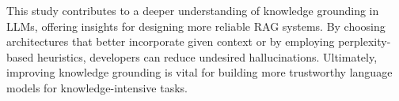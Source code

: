 This study contributes to a deeper understanding of knowledge grounding in LLMs, offering insights for designing more reliable RAG systems.
By choosing architectures that better incorporate given context or by employing perplexity-based heuristics, developers can reduce undesired hallucinations.
Ultimately, improving knowledge grounding is vital for building more trustworthy language models for knowledge-intensive tasks.
